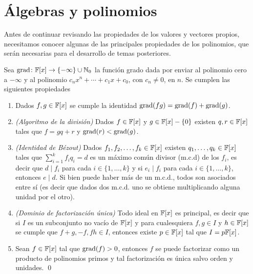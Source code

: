\section{Álgebras y polinomios}

Antes de continuar revisando las propiedades de los valores y vectores propios, necesitamos conocer algunas de las principales propiedades de los polinomios, que serán necesarias para el desarrollo de temas posteriores.


\begin{teor}
  Sea $\operatorname{grad}\colon \mathbb{F}[x] \to \{-\infty\} \cup \mathbb{N}_0$ la función grado dada por enviar al polinomio cero a $-\infty$ y al polinomio $c_n x^n + \cdots + c_1x + c_0$, con $c_n \neq 0$, en $n$. Se cumplen las siguientes propiedades
  \begin{enumerate}
    \item Dados $f, g \in \mathbb{F}[x]$ se cumple la identidad $\operatorname{grad}(fg) = \operatorname{grad}(f) + \operatorname{grad}(g)$.
    
    \item \emph{(Algoritmo de la división)} Dados $f \in \mathbb{F}[x]$ y $g \in \mathbb{F}[x] - \{0\}$ existen $q, r \in \mathbb{F}[x]$ tales que $f = gq+r$ y $\operatorname{grad}(r) < \operatorname{grad}(g)$.
    
    \item \emph{(Identidad de Bézout)} Dados $f_1, f_2, \ldots, f_k \in \mathbb{F}[x]$ existen $q_1, \ldots, q_k \in \mathbb{F}[x]$ tales que $\sum_{i=1}^k f_i q_i = d$ es un máximo común divisor (m.c.d) de los $f_i$, es decir que $d \mid f_i$ para cada $i \in \{1,\ldots,k\}$ y si $e_i \mid f_i$ para cada $i \in \{1,\ldots,k\}$, entonces $e \mid d$. Si bien puede haber más de un m.c.d., todos son asociados entre sí (es decir que dados dos m.c.d. uno se obtiene multiplicando alguna unidad por el otro).
    
    \item \emph{(Dominio de factorización única)} Todo ideal en $\mathbb{F}[x]$ es principal, es decir que si $I$ es un subconjunto no vacío de $\mathbb{F}[x]$ y para cualesquiera $f, g \in I$ y $h \in \mathbb{F}[x]$ se cumple que $f+g, -f, fh \in I$, entonces existe $p \in \mathbb{F}[x]$ tal que $I = p\mathbb{F}[x]$.
    
    \item Sean $f \in \mathbb{F}[x]$ tal que $\operatorname{grad}(f)>0$, entonces $f$ se puede factorizar como un producto de polinomios primos y tal factorización es única salvo orden y unidades. \qed
  \end{enumerate}
\end{teor}
 


